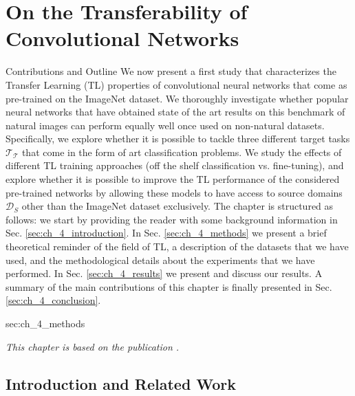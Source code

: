 \chapter{On the Transferability of Convolutional Networks}
\label{ch:tl_natural_to_non_natural}

\begin{remark}{Contributions and Outline} 
	We now present a first study that characterizes the Transfer Learning (TL) properties of convolutional neural networks that come as pre-trained on the ImageNet dataset. We thoroughly investigate whether popular neural networks that have obtained state of the art results on this benchmark of natural images can perform equally well once used on non-natural datasets. Specifically, we explore whether it is possible to tackle three different target tasks $\mathcal{T_T}$ that come in the form of art classification problems. We study the effects of different TL training approaches (off the shelf classification vs. fine-tuning), and explore whether it is possible to improve the TL performance of the considered pre-trained networks by allowing these models to have access to source domains $\mathcal{D}_S$ other than the ImageNet dataset exclusively. The chapter is structured as follows: we start by providing the reader with some background information in Sec. \ref{sec:ch_4_introduction}. In Sec. \ref{sec:ch_4_methods} we present a brief theoretical reminder of the field of TL, a description of the datasets that we have used, and the methodological details about the experiments that we have performed. In Sec. \ref{sec:ch_4_results} we present and discuss our results. A summary of the main contributions of this chapter is finally presented in Sec. \ref{sec:ch_4_conclusion}.

sec:ch_4_methods\vspace{5mm}

\textit{This chapter is based on the publication \citet{sabatelli2018deep}.}
\end{remark}



\iffalse
\section{Introduction and Related Work}
\label{sec:introduction}



